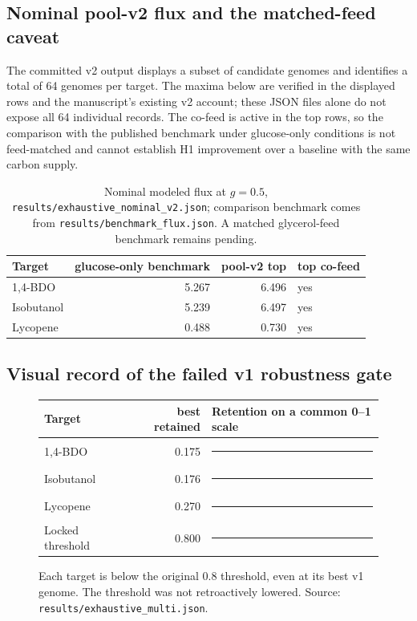 \subsection{Nominal pool-v2 flux and the matched-feed caveat}
The committed v2 output displays a subset of candidate genomes and identifies a total of 64 genomes per target. The maxima below are verified in the displayed rows and the manuscript's existing v2 account; these JSON files alone do not expose all 64 individual records. The co-feed is active in the top rows, so the comparison with the published benchmark under glucose-only conditions is not feed-matched and cannot establish H1 improvement over a baseline with the same carbon supply.\begin{table}[!htbp]\centering\small\caption{Nominal modeled flux at $g=0.5$, \texttt{results/exhaustive\_nominal\_v2.json}; comparison benchmark comes from \texttt{results/benchmark\_flux.json}. A matched glycerol-feed benchmark remains pending.}\begin{tabular}{lrrl}\hline Target & glucose-only benchmark & pool-v2 top & top co-feed \\\hline
1,4-BDO & 5.267 & 6.496 & yes \\
Isobutanol & 5.239 & 6.497 & yes \\
Lycopene & 0.488 & 0.730 & yes \\
\hline\end{tabular}\end{table}
\subsection{Visual record of the failed v1 robustness gate}
\begin{figure}[ht]\centering\small\begin{tabular}{lrl}\hline Target & best retained & Retention on a common 0--1 scale \\\hline
1,4-BDO & 0.175 & \textcolor{paperblue}{\rule{1.22cm}{5pt}} \\
Isobutanol & 0.176 & \textcolor{paperblue}{\rule{1.23cm}{5pt}} \\
Lycopene & 0.270 & \textcolor{paperblue}{\rule{1.89cm}{5pt}} \\
Locked threshold & 0.800 & \textcolor{black}{\rule{5.60cm}{5pt}} \\\hline\end{tabular}\caption{Each target is below the original 0.8 threshold, even at its best v1 genome. The threshold was not retroactively lowered. Source: \texttt{results/exhaustive\_multi.json}.}\end{figure}
